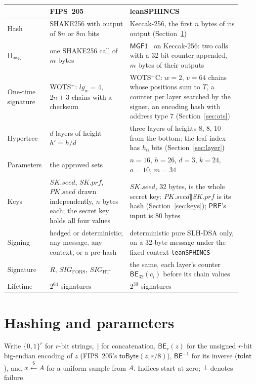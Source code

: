 \documentclass[11pt]{article}
\newcommand{\bits}[1]{\{0,1\}^{#1}}
\newcommand{\getsr}{\stackrel{\$}{\gets}}
\newcommand{\PRF}{\mathsf{PRF}}
\newcommand{\Hmsg}{\mathsf{H}_{\mathrm{msg}}}
\newcommand{\BE}{\mathsf{BE}}
\newcommand{\concat}{\mathbin\Vert}
\newcommand{\pkseed}{\mathit{PK.seed}}
\newcommand{\skseed}{\mathit{SK.seed}}
\newcommand{\skprf}{\mathit{SK.prf}}
\begin{document}
\begin{table}[ht]
\centering
\small
\renewcommand{\arraystretch}{1.15}
\begin{tabular}{@{}>{\raggedright}p{0.15\linewidth}>{\raggedright}p{0.33\linewidth}>{\raggedright\arraybackslash}p{0.46\linewidth}@{}}
\toprule
& FIPS~205 & leanSPHINCS\\
\midrule
Hash & SHAKE256 with output of $8n$ or $8m$ bits & Keccak-256, the first $n$ bytes of its output (Section~\ref{sec:parameters})\\
$\Hmsg$ & one SHAKE256 call of $m$ bytes & $\mathsf{MGF1}$~\cite{RFC8017} on Keccak-256: two calls with a 32-bit counter appended, $m$ bytes of their outputs\\
One-time signature & WOTS$^+$: $\mathit{lg}_w=4$, $2n+3$ chains with a checksum & WOTS$^+$C: $w=2$, $v=64$ chains whose positions sum to $T$, a counter per layer searched by the signer, an encoding hash with address type $7$ (Section~\ref{sec:ots})\\
Hypertree & $d$ layers of height $h'=h/d$ & three layers of heights $8$, $8$, $10$ from the bottom; the leaf index has $h_0$ bits (Section~\ref{sec:layer})\\
Parameters & the approved sets & $n=16$, $h=26$, $d=3$, $k=24$, $a=10$, $m=34$\\
Keys & $\skseed$, $\skprf$, $\pkseed$ drawn independently, $n$ bytes each; the secret key holds all four values & $\skseed$, 32 bytes, is the whole secret key; $\pkseed\concat\skprf$ is its hash (Section~\ref{sec:keys}); $\PRF$'s input is 80 bytes\\
Signing & hedged or deterministic; any message, any context, or a pre-hash & deterministic pure SLH-DSA only, on a 32-byte message under the fixed context \texttt{leanSPHINCS}\\
Signature & $R$, $\mathit{SIG}_{\mathrm{FORS}}$, $\mathit{SIG}_{\mathrm{HT}}$ & the same, each layer's counter $\BE_{32}(c_l)$ before its chain values\\
Lifetime & $2^{64}$ signatures & $2^{30}$ signatures\\
\bottomrule
\end{tabular}
\end{table}

\section{Hashing and parameters}
\label{sec:parameters}

Write $\bits r$ for $r$-bit strings, $\concat$ for concatenation, $\BE_r(z)$ for the unsigned $r$-bit big-endian encoding of $z$ (FIPS~205's $\mathsf{toByte}(z,r/8)$), $\BE^{-1}$ for its inverse ($\mathsf{toInt}$), and $x\getsr A$ for a uniform sample from $A$. Indices start at zero; $\bot$ denotes failure.
\end{document}
